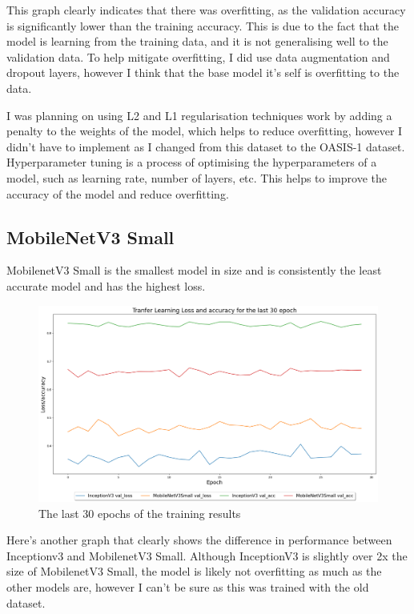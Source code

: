 \documentclass[]{final_report}
\begin{document}
This graph clearly indicates that there was overfitting, as the validation accuracy is significantly lower than the training accuracy.
This is due to the fact that the model is learning from the training data, and it is not generalising well to the validation data.
To help mitigate overfitting, I did use data augmentation and dropout layers, however I think that the base model it's self is overfitting to the data.

I was planning on using L2 and L1 regularisation techniques work by adding a penalty to the weights of the model, which helps to reduce overfitting, however I didn't have to implement as I changed from this dataset to the OASIS-1 dataset.
Hyperparameter tuning is a process of optimising the hyperparameters of a model, such as learning rate, number of layers, etc.
This helps to improve the accuracy of the model and reduce overfitting.


\pagebreak

\subsection{MobileNetV3 Small}

MobilenetV3 Small is the smallest model in size and is consistently the least accurate model and has the highest loss.

\begin{figure}[ht!]
  \centering
  \includegraphics[width=120mm]{images/mobilenet-v3-small-vs-inception-v3.png}
  \caption{The last 30 epochs of the training results}
\end{figure}

Here's another graph that clearly shows the difference in performance between Inceptionv3 and MobilenetV3 Small.
Although InceptionV3 is slightly over 2x the size of MobilenetV3 Small, the model is likely not overfitting as much as the other models are, however I can't be sure as this was trained with the old dataset.
\end{document}
